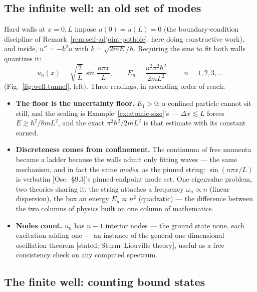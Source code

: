 \documentclass[11pt]{article}
\theoremstyle{plain}
\theoremstyle{definition}
\theoremstyle{remark}
\begin{document}
\subsection{The infinite well: an old set of modes}
\label{sec:box}

Hard walls at $x = 0, L$ impose $u(0) = u(L) = 0$ (the
boundary-condition discipline of
Remark~\ref{rem:self-adjoint-pothole}, here doing constructive
work), and inside, $u'' = -k^2 u$ with $k = \sqrt{2mE}/\hbar$. Requiring
the sine to fit both walls quantizes it:
\begin{equation}
  \boxed{\;
  u_n(x) = \sqrt{\frac 2L}\,\sin\frac{n\pi x}{L},
  \qquad
  E_n = \frac{n^2\pi^2\hbar^2}{2mL^2},
  \qquad n = 1, 2, 3, \dots
  \;}
  \label{eq:box-spectrum}
\end{equation}
(Fig.~\ref{fig:well-tunnel}, left). Three readings, in ascending
order of reach:
\begin{itemize}
  \item \textbf{The floor is the uncertainty floor.} $E_1 > 0$: a
  confined particle cannot sit still, and the scaling is
  Example~\ref{ex:atomic-size}'s --- $\Delta x \lesssim L$ forces
  $E \gtrsim \hbar^2/8mL^2$, and the exact
  $\pi^2\hbar^2/2mL^2$ is that estimate with its constant earned.
  \item \textbf{Discreteness comes from confinement.} The continuum
  of free momenta became a ladder because the walls admit only
  fitting waves --- the same mechanism, and in fact the same
  \emph{modes}, as the pinned string: $\sin(n\pi x/L)$ is verbatim
  [Osc.\ \S9.3]'s pinned-endpoint mode set. One eigenvalue problem,
  two theories sharing it: the string attaches a frequency
  $\omega_n \propto n$ (linear dispersion), the box an energy
  $E_n \propto n^2$ (quadratic) --- the difference between the two
  columns of physics built on one column of mathematics.
  \item \textbf{Nodes count.} $u_n$ has $n - 1$ interior nodes ---
  the ground state none, each excitation adding one --- an instance
  of the general one-dimensional oscillation theorem [stated;
  Sturm--Liouville theory], useful as a free consistency check on
  any computed spectrum.
\end{itemize}

\subsection{The finite well: counting bound states}
\label{sec:finite-well}
\end{document}
